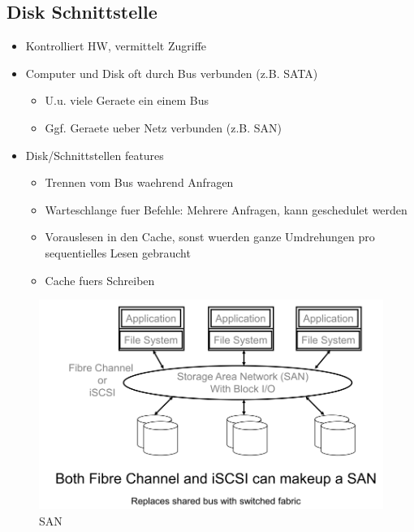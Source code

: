 \documentclass[a4paper]{scrreprt}
\begin{document}
\subsection{Disk Schnittstelle}
\begin{itemize}
	\item Kontrolliert HW, vermittelt Zugriffe
	\item Computer und Disk oft durch Bus verbunden (z.B. SATA)
		\begin{itemize}
			\item U.u. viele Geraete ein einem Bus
			\item Ggf. Geraete ueber Netz verbunden (z.B. SAN)
		\end{itemize}
	\item Disk/Schnittstellen features
		\begin{itemize}
			\item Trennen vom Bus waehrend Anfragen
			\item Warteschlange fuer Befehle: Mehrere Anfragen, kann geschedulet werden
			\item Vorauslesen in den Cache, sonst wuerden ganze Umdrehungen pro sequentielles Lesen gebraucht
			\item Cache fuers Schreiben
		\end{itemize}
\end{itemize}

\begin{figure}[ht]
\centering
\includegraphics[scale=0.4]{san.png}
\caption{SAN}
\end{figure}
\end{document}
